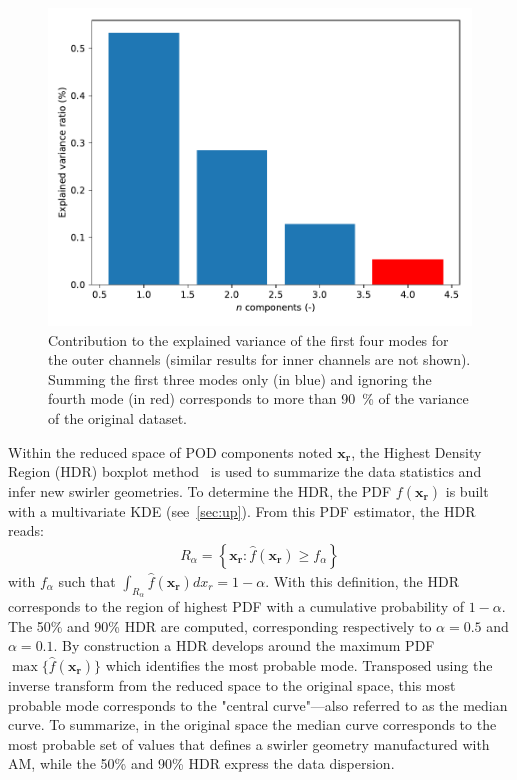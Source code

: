 \begin{figure}[!ht]
\centering
\includegraphics[width=0.7\linewidth,height=\textheight,keepaspectratio]{fig/applications/swirler/variance_ratio.pdf}
\caption{Contribution to the explained variance of the first four modes for the outer channels (similar results for inner channels are not shown). Summing the first three modes only (in blue) and ignoring the fourth mode (in red) corresponds to more than 90~\% of the variance of the original dataset.}
\label{fig:variance}
\end{figure}

Within the reduced space of POD components noted $\mathbf{x_r}$, the Highest Density Region (HDR) boxplot method~\cite{Hyndman2009} is used to summarize the data statistics and infer new swirler geometries. To determine the HDR, the PDF $f(\mathbf{x_r})$ is built with a multivariate KDE (see~\cref{sec:up}). From this PDF estimator, the HDR reads:
\begin{align}
R_\alpha = \left\{ \mathbf{x_r}: \hat{f}(\mathbf{x_r}) \geq f_{\alpha} \right\}
\end{align}
\noindent with $f_{\alpha}$ such that $\int_{R_\alpha} \hat{f}(\mathbf{x_r}) d x_r = 1 - \alpha$. With this definition, the HDR corresponds to the region of highest PDF with a cumulative probability of $1-\alpha$. The 50\% and 90\% HDR are computed, corresponding respectively to $\alpha=0.5$ and $\alpha=0.1$. By construction  a HDR develops around the maximum PDF $\max \{\hat{f}(\mathbf{x_r})\}$ which identifies the most probable mode. Transposed using the inverse transform from the reduced space to the original space, this most probable mode corresponds to the "central curve"---also referred to as the median curve. To summarize, in the original space the median curve corresponds to the most probable set of values that defines a swirler geometry manufactured with AM, while the 50\% and 90\% HDR express the data dispersion.


